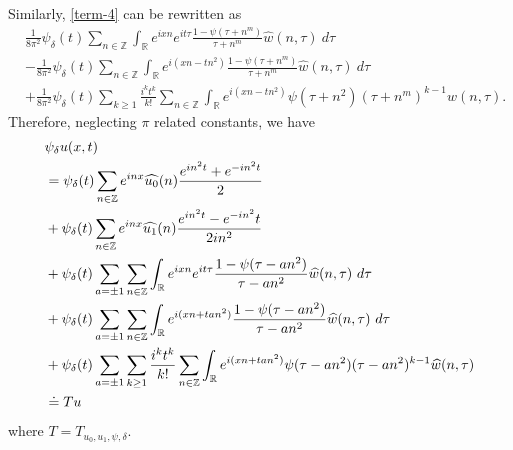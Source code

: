 \documentclass[12pt,reqno]{amsart}
\numberwithin{equation}{section}  %
\newcommand{\rr}{\mathbb{R}}
\newcommand{\zz}{\mathbb{Z}}
\newcommand{\wh}{\widehat}
\begin{document}
%
Similarly, \eqref{term-4} can be rewritten as
%
\begin{align}
		\label{main-int-expression''-2}
		& \frac{1}{8 \pi^2} \psi_{\delta}(t) \sum_{n\in \zz} \int_\rr e^{ixn}  
		e^{it \tau} \frac{ 1 - \psi(\tau +  n^m) 
		}{\tau +  n^m} \wh{w}(n, \tau) \ d \tau
		\\
		\label{main-int-expression''-3}
		&  - \frac{1}{8 \pi^2} \psi_{\delta}(t) \sum_{n\in \zz} \int_\rr e^{i(xn - 
		t n^2)}
		 \frac{1- \psi(\tau +  n^m)}{\tau +  n^m} \wh{w}(n, \tau) \ d \tau
		\\
		\label{main-int-expression''-4}
		& + \frac{1}{8 \pi^2} \psi_{\delta}(t) \sum_{k \ge 1} \frac{i^k t^k}{k!}
		\sum_{n \in \zz} \int_\rr e^{i(xn - t n^2 )}
		\psi(\tau +  n^2) (\tau +  n^m)^{k-1} \wh{w}(n, \tau).
\end{align}
%
%
Therefore, neglecting $\pi$ related constants, we have
%
%
\begin{align}
  & \psi_{\delta} u(x,t)
  \notag
  \\
  \label{main-rel-term-1}
  & = \psi_{\delta}(t) \sum_{n \in \zz} e^{inx} \wh{u_{0}}(n) \frac{e^{in^{2}t} + e^{-in^{2}t}}{2} 
  \\
  \label{main-rel-term-2}
  & + \psi_{\delta}(t) \sum_{n \in \zz} e^{inx}
  \wh{u_{1}}(n)\frac{e^{in^{2}t} - e^{-in^{2}}t}{2 i n^{2}} 
  \\
  \label{main-rel-term-3}
  & + \psi_{\delta}(t) \sum_{a = \pm 1} \sum_{n\in \zz} \int_\rr e^{ixn}  
  e^{it \tau} \frac{ 1 - \psi(\tau -  an^{2}) 
  }{\tau -  an^{2}} \wh{w}(n, \tau) \ d \tau
  \\
  \label{main-rel-term-4}
  & + \psi_{\delta}(t) \sum_{a = \pm 1} \sum_{n\in \zz} \int_\rr e^{i(xn + 
  t an^{2})}
  \frac{1- \psi(\tau -  an^{2})}{\tau -  an^{2}} \wh{w}(n, \tau) \ d \tau
  \\
  & + \psi_{\delta}(t) \sum_{a = \pm 1}  \sum_{k \ge 1} \frac{i^k t^k}{k!}
  \sum_{n \in \zz} \int_\rr e^{i(xn + t an^{2} )}
  \psi(\tau -  an^{2}) (\tau -  an^{2})^{k-1} \wh{w}(n, \tau)
  \\
  \label{main-rel-term-5}
  & \doteq Tu
\end{align}
%
%
where $T=T_{u_0, u_1, \psi, \delta}$.
\end{document}
